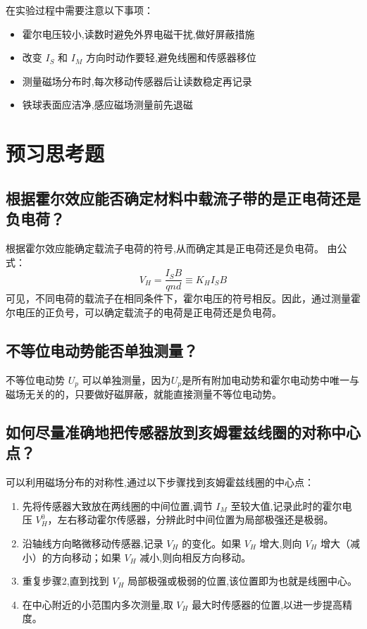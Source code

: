 \documentclass[UTF8]{ctexart}
\begin{document}
    在实验过程中需要注意以下事项：
    \begin{itemize}
        \item 霍尔电压较小,读数时避免外界电磁干扰,做好屏蔽措施
        \item 改变 $I_S$ 和 $I_M$ 方向时动作要轻,避免线圈和传感器移位
        \item 测量磁场分布时,每次移动传感器后让读数稳定再记录
        \item 铁球表面应洁净,感应磁场测量前先退磁
    \end{itemize}

    \section{预习思考题}

\subsection{根据霍尔效应能否确定材料中载流子带的是正电荷还是负电荷？}
根据霍尔效应能确定载流子电荷的符号,从而确定其是正电荷还是负电荷。
由公式：
    \begin{equation}
    V_H = \frac{I_SB}{qnd} \equiv K_HI_SB
    \end{equation}
可见，不同电荷的载流子在相同条件下，霍尔电压的符号相反。因此，通过测量霍尔电压的正负号，可以确定载流子的电荷是正电荷还是负电荷。
\subsection{不等位电动势能否单独测量？}
不等位电动势 $U_p$ 可以单独测量，因为$U_p$是所有附加电动势和霍尔电动势中唯一与磁场无关的的，只要做好磁屏蔽，就能直接测量不等位电动势。

\subsection{如何尽量准确地把传感器放到亥姆霍兹线圈的对称中心点？}
可以利用磁场分布的对称性,通过以下步骤找到亥姆霍兹线圈的中心点：
\begin{enumerate}
    \item 先将传感器大致放在两线圈的中间位置,调节 $I_M$ 至较大值,记录此时的霍尔电压 $V_H^0$，左右移动霍尔传感器，分辨此时中间位置为局部极强还是极弱。
    \item 沿轴线方向略微移动传感器,记录 $V_H$ 的变化。如果 $V_H$ 增大,则向 $V_H$ 增大（减小）的方向移动；如果 $V_H$ 减小,则向相反方向移动。
    \item 重复步骤2,直到找到 $V_H$ 局部极强或极弱的位置,该位置即为也就是线圈中心。
    \item 在中心附近的小范围内多次测量,取 $V_H$ 最大时传感器的位置,以进一步提高精度。
\end{enumerate}
\end{document}
